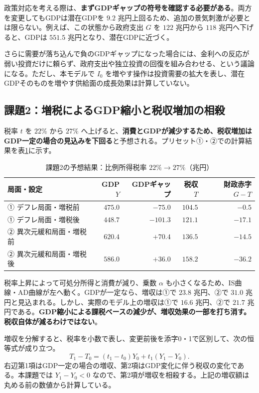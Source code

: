 \documentclass[lualatex,a4paper,11pt,ja=standard]{bxjsarticle}
\begin{document}
政策対応を考える際は、\textbf{まずGDPギャップの符号を確認する必要がある}。両方を変更してもGDPは潜在GDPを $9.2$ 兆円上回るため、追加の景気刺激が必要とは限らない。例えば、この状態から政府支出 $G$ を $122$ 兆円から $118$ 兆円へ下げると、GDPは $551.5$ 兆円となり、潜在GDPに近づく。

さらに需要が落ち込んで負のGDPギャップになった場合には、金利への反応が弱い投資だけに頼らず、政府支出や独立投資の回復を組み合わせる、という議論になる。ただし、本モデルで $I_0$ を増やす操作は投資需要の拡大を表し、潜在GDPそのものを増やす供給面の成長効果は計算していない。

\clearpage
\subsection{課題2：増税によるGDP縮小と税収増加の相殺}

税率 $t$ を $22\%$ から $27\%$ へ上げると、\textbf{消費とGDPが減少するため、税収増加はGDP一定の場合の見込みを下回る}と予想される。プリセット①・②での計算結果を表\ref{tab:expected_tax}に示す。

\begin{table}[htbp]
\centering
\caption{課題2の予想結果：比例所得税率 $22\%\to27\%$（兆円）}
\label{tab:expected_tax}
\small
\begin{tabular}{@{}lrrrr@{}}
\toprule
\textbf{局面・設定} & \textbf{GDP $Y$} & \textbf{GDPギャップ} & \textbf{税収 $T$} & \textbf{財政赤字 $G-T$} \\
\midrule
① デフレ局面・増税前 & $475.0$ & $-75.0$ & $104.5$ & $-0.5$ \\
① デフレ局面・増税後 & $448.7$ & $-101.3$ & $121.1$ & $-17.1$ \\
\addlinespace
② 異次元緩和局面・増税前 & $620.4$ & $+70.4$ & $136.5$ & $-14.5$ \\
② 異次元緩和局面・増税後 & $586.0$ & $+36.0$ & $158.2$ & $-36.2$ \\
\bottomrule
\end{tabular}
\end{table}

税率上昇によって可処分所得と消費が減り、乗数 $\alpha$ も小さくなるため、IS曲線・AD曲線が左へ動く。GDPが一定なら、増収は①で $23.8$ 兆円、②で $31.0$ 兆円と見込まれる。しかし、実際のモデル上の増収は①で $16.6$ 兆円、②で $21.7$ 兆円である。\textbf{GDP縮小による課税ベースの減少が、増収効果の一部を打ち消す。税収自体が減るわけではない}。

増収を分解すると、税率を小数で表し、変更前後を添字0・1で区別して、次の恒等式が成り立つ。
\begin{equation}
  T_1-T_0 = (t_1-t_0)Y_0 + t_1(Y_1-Y_0).
  \label{eq:tax_change_decomposition}
\end{equation}
右辺第1項はGDP一定の場合の増収、第2項はGDP変化に伴う税収の変化である。本課題では $Y_1-Y_0<0$ なので、第2項が増収を相殺する。上記の増収額は丸める前の数値から計算している。
\end{document}
